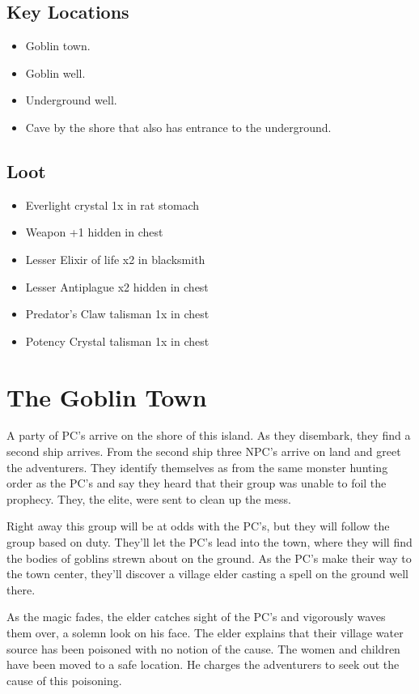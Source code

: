 \begin{multicols}{2}
  \subsection{Key Locations}
  \begin{itemize}
    \item Goblin town.
    \item Goblin well.
    \item Underground well.
    \item Cave by the shore that also has entrance to the underground.
  \end{itemize}

  \subsection{Loot}

  \begin{itemize}
    \item Everlight crystal 1x in rat stomach
    \item Weapon +1 hidden in chest
    \item Lesser Elixir of life x2 in blacksmith
    \item Lesser Antiplague x2 hidden in chest
    \item Predator's Claw talisman 1x in chest
    \item Potency Crystal talisman 1x in chest
  \end{itemize}

  \section{The Goblin Town}
  A party of PC's arrive on the shore of this island. As they disembark, they find a second ship arrives. From the second ship three NPC's arrive on land and greet the adventurers. They identify themselves as from the same monster hunting order as the PC's and say they heard that their group was unable to foil the prophecy. They, the elite, were sent to clean up the mess.

  Right away this group will be at odds with the PC's, but they will follow the group based on duty. They'll let the PC's lead into the town, where they will find the bodies of goblins strewn about on the ground. As the PC's make their way to the town center, they'll discover a village elder casting a spell on the ground well there.

  As the magic fades, the elder catches sight of the PC's and vigorously waves them over, a solemn look on his face. The elder explains that their village water source has been poisoned with no notion of the cause. The women and children have been moved to a safe location. He charges the adventurers to seek out the cause of this poisoning.


\end{multicols}
